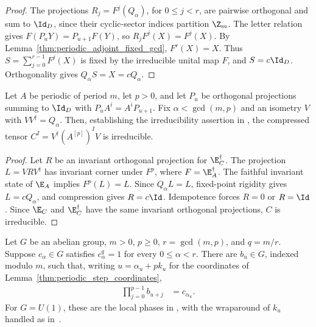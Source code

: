 \begin{proof}\leanok
    The projections $R_j=F^j(Q_\alpha)$, for $0\le j<r$, are pairwise
    orthogonal and sum to $\Id_D$, since their cyclic-sector indices
    partition $\Z_m$. The letter relation gives
    $F(P_uY)=P_{u+1}F(Y)$, so $R_jF^j(X)=F^j(X)$.
    By Lemma~\ref{thm:periodic_adjoint_fixed_gcd}, $F^r(X)=X$.
    Thus $S=\sum_{j=0}^{r-1}F^j(X)$ is fixed by the irreducible unital
    map $F$, and $S=c\Id_D$. Orthogonality gives
    $Q_\alpha S=X=cQ_\alpha$.
\end{proof}

\begin{lemma}
    \label{thm:periodic_compressed_irreducible}
    \leanok
    Let $A$ be periodic of period $m$, let $p>0$, and let $P_u$ be
    orthogonal projections summing to $\Id_D$ with $P_uA^i=A^iP_{u+1}$.
    Fix $\alpha<\gcd(m,p)$ and an isometry $V$ with
    $VV^\dagger=Q_\alpha$. Then, establishing the irreducibility assertion in
    \cite[Lemma~6]{DeLasCuevas2017Irreducible}, the compressed tensor
    $C^I=V^\dagger(A^{[p]})^IV$ is irreducible.
\end{lemma}

\begin{proof}\leanok
    Let $R$ be an invariant orthogonal projection for $\E_C^\dagger$.
    The projection $L=VRV^\dagger$ has invariant corner under
    $F^p$, where $F=\E_A^\dagger$. The faithful invariant state of $\E_A$
    implies $F^p(L)=L$. Since $Q_\alpha L=L$, fixed-point rigidity
    gives $L=cQ_\alpha$, and compression gives $R=c\Id$.
    Idempotence forces $R=0$ or $R=\Id$. Since $\E_C$ and $\E_C^\dagger$ have
    the same invariant orthogonal projections, $C$ is irreducible.
\end{proof}

\begin{lemma}
    \label{thm:periodic_orbit_phase_products}
    \leanok
    Let $G$ be an abelian group, $m>0$, $p\ge0$, $r=\gcd(m,p)$,
    and $q=m/r$. Suppose $c_\alpha\in G$ satisfies $c_\alpha^q=1$
    for every $0\le\alpha<r$. There are $b_u\in G$, indexed modulo
    $m$, such that, writing $u=\alpha_u+pk_u$ for the coordinates of
    Lemma~\ref{thm:periodic_step_coordinates},
    \begin{align}
        \prod_{j=0}^{p-1}b_{u+j} & = c_{\alpha_u}.
        \label{eq:periodic_orbit_phase_product}
    \end{align}
    For $G=U(1)$, these are the local phases in
    \cite[proof of Theorem~4.1]{DeLasCuevas2017Irreducible}, with the
    wraparound of $k_u$ handled as in~\cite{gap:dccsp17_orbit_phase_wraparound}.
\end{lemma}

